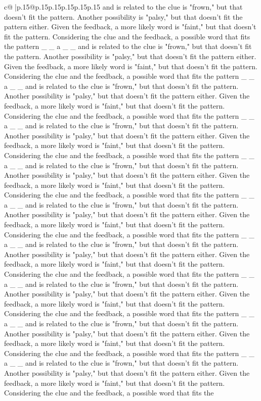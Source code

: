 \documentclass{article}
\begin{document}
{\begin{supertabular}{c@{$\;$}|p{.15\linewidth}@{}p{.15\linewidth}p{.15\linewidth}p{.15\linewidth}p{.15\linewidth}p{.15\linewidth}}
{{{and is related to the clue is "frown," but that doesn't fit the pattern. Another possibility is "palsy," but that doesn't fit the pattern either. Given the feedback, a more likely word is "faint," but that doesn't fit the pattern. Considering the clue and the feedback, a possible word that fits the pattern \_ \_ a \_ \_ and is related to the clue is "frown," but that doesn't fit the pattern. Another possibility is "palsy," but that doesn't fit the pattern either. Given the feedback, a more likely word is "faint," but that doesn't fit the pattern. Considering the clue and the feedback, a possible word that fits the pattern \_ \_ a \_ \_ and is related to the clue is "frown," but that doesn't fit the pattern. Another possibility is "palsy," but that doesn't fit the pattern either. Given the feedback, a more likely word is "faint," but that doesn't fit the pattern. Considering the clue and the feedback, a possible word that fits the pattern \_ \_ a \_ \_ and is related to the clue is "frown," but that doesn't fit the pattern. Another possibility is "palsy," but that doesn't fit the pattern either. Given the feedback, a more likely word is "faint," but that doesn't fit the pattern. Considering the clue and the feedback, a possible word that fits the pattern \_ \_ a \_ \_ and is related to the clue is "frown," but that doesn't fit the pattern. Another possibility is "palsy," but that doesn't fit the pattern either. Given the feedback, a more likely word is "faint," but that doesn't fit the pattern. Considering the clue and the feedback, a possible word that fits the pattern \_ \_ a \_ \_ and is related to the clue is "frown," but that doesn't fit the pattern. Another possibility is "palsy," but that doesn't fit the pattern either. Given the feedback, a more likely word is "faint," but that doesn't fit the pattern. Considering the clue and the feedback, a possible word that fits the pattern \_ \_ a \_ \_ and is related to the clue is "frown," but that doesn't fit the pattern. Another possibility is "palsy," but that doesn't fit the pattern either. Given the feedback, a more likely word is "faint," but that doesn't fit the pattern. Considering the clue and the feedback, a possible word that fits the pattern \_ \_ a \_ \_ and is related to the clue is "frown," but that doesn't fit the pattern. Another possibility is "palsy," but that doesn't fit the pattern either. Given the feedback, a more likely word is "faint," but that doesn't fit the pattern. Considering the clue and the feedback, a possible word that fits the pattern \_ \_ a \_ \_ and is related to the clue is "frown," but that doesn't fit the pattern. Another possibility is "palsy," but that doesn't fit the pattern either. Given the feedback, a more likely word is "faint," but that doesn't fit the pattern. Considering the clue and the feedback, a possible word that fits the pattern \_ \_ a \_ \_ and is related to the clue is "frown," but that doesn't fit the pattern. Another possibility is "palsy," but that doesn't fit the pattern either. Given the feedback, a more likely word is "faint," but that doesn't fit the pattern. Considering the clue and the feedback, a possible word that fits the }}}
\end{supertabular}}
\end{document}
